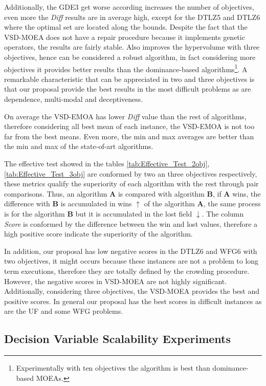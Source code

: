 %
Additionally, the GDE3 get worse according increases the number of objectives, even more the \textit{Diff} results are in average high, except for the DTLZ5 and DTLZ6 where the optimal set are located along the bounds.
%
Despite the fact that the VSD-MOEA does not have a repair procedure because it implements genetic operators, the results are fairly stable.
%
Also improves the hypervolume with three objectives, hence can be considered a robust algorithm, in fact considering more objectives it provides better results than the dominance-based algorithms\footnote{Experimentally with ten objectives the algorithm is best than dominance-based MOEAs.}.
%
A remarkable characteristic that can be appreciated in two and three objectives is that our  proposal provide the best results in the most difficult problems as are dependence, multi-modal and deceptiveness.

%
On average the VSD-EMOA has lower \textit{Diff} value than the rest of algorithms, therefore considering all best mean of each instance, the VSD-EMOA is not too far from the best means.
%
Even more, the min and max averages are better than the min and max of the state-of-art algorithms.
%

The effective test showed in the tables \ref{tab:Effective_Test_2obj}, \ref{tab:Effective_Test_3obj} are conformed by two an three objectives respectively,  these metrics qualify the superiority of each algorithm with the rest through pair comparisons.
%
Thus, an algorithm \textbf{A} is compared with algorithm \textbf{B}, if \textbf{A} wins, the difference with \textbf{B} is accumulated in wins $\uparrow$ of the algorithm \textbf{A}, the same process is for the algorithm \textbf{B} but it is accumulated in the lost field $\downarrow$.
%
The column \textit{Score} is conformed by the difference between the win and lost values, therefore a high positive score indicate the superiority of the algorithm.
%

In addition, our proposal has low negative scores in the DTLZ6 and WFG6 with two objectives, it might occurs because these instances are not a problem to long term executions, therefore they are totally defined by the crowding procedure.
%
However, the negative scores in VSD-MOEA are not highly significant.
%
Additionally, considering three objectives, the VSD-MOEA provides the best and positive scores.
%
In general our proposal has the best scores in difficult instances as are the UF and some WFG problems.

\subsection{Decision Variable Scalability Experiments}

